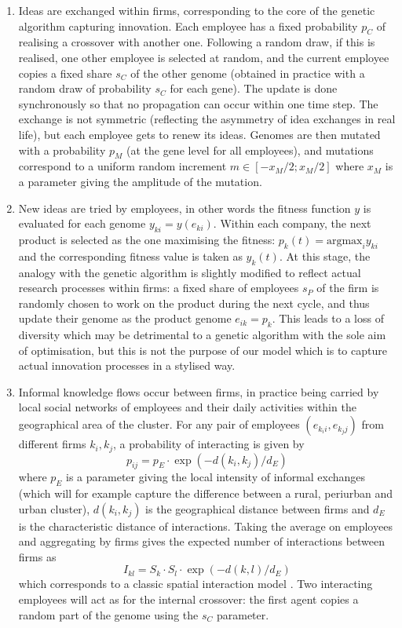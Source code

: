 \documentclass[letterpaper]{article}
\begin{document}
\begin{enumerate}
    \item Ideas are exchanged within firms, corresponding to the core of the genetic algorithm capturing innovation. Each employee has a fixed probability $p_C$ of realising a crossover with another one. Following a random draw, if this is realised, one other employee is selected at random, and the current employee copies a fixed share $s_C$ of the other genome (obtained in practice with a random draw of probability $s_C$ for each gene). The update is done synchronously so that no propagation can occur within one time step. The exchange is not symmetric (reflecting the asymmetry of idea exchanges in real life), but each employee gets to renew its ideas. Genomes are then mutated with a probability $p_M$ (at the gene level for all employees), and mutations correspond to a uniform random increment $m \in \left[ -x_M/2 ; x_M/2 \right]$ where $x_M$ is a parameter giving the amplitude of the mutation.
    \item New ideas are tried by employees, in other words the fitness function $y$ is evaluated for each genome $y_{ki} = y(e_{ki})$. Within each company, the next product is selected as the one maximising the fitness: $p_k (t) = \textrm{argmax}_i y_{ki}$ and the corresponding fitness value is taken as $y_k (t)$. At this stage, the analogy with the genetic algorithm is slightly modified to reflect actual research processes within firms: a fixed share of employees $s_P$ of the firm is randomly chosen to work on the product during the next cycle, and thus update their genome as the product genome $e_{ik} = p_k$. This leads to a loss of diversity which may be detrimental to a genetic algorithm with the sole aim of optimisation, but this is not the purpose of our model which is to capture actual innovation processes in a stylised way.
    \item Informal knowledge flows occur between firms, in practice being carried by local social networks of employees and their daily activities within the geographical area of the cluster. For any pair of employees $(e_{k_i i}, e_{k_j j})$ from different firms $k_i,k_j$, a probability of interacting is given by
    \[
    p_{ij} = p_E \cdot \exp{\left( - d(k_i,k_j) / d_E \right)}
    \]
    where $p_E$ is a parameter giving the local intensity of informal exchanges (which will for example capture the difference between a rural, periurban and urban cluster), $d(k_i,k_j)$ is the geographical distance between firms and $d_E$ is the characteristic distance of interactions. Taking the average on employees and aggregating by firms gives the expected number of interactions between firms as
    \[
    I_{kl} = S_k \cdot S_l \cdot \exp{\left( - d(k,l) / d_E \right)}
    \]
    which corresponds to a classic spatial interaction model \citep{wilson1975some}. Two interacting employees will act as for the internal crossover: the first agent copies a random part of the genome using the $s_C$ parameter.
\end{enumerate}
\end{document}
